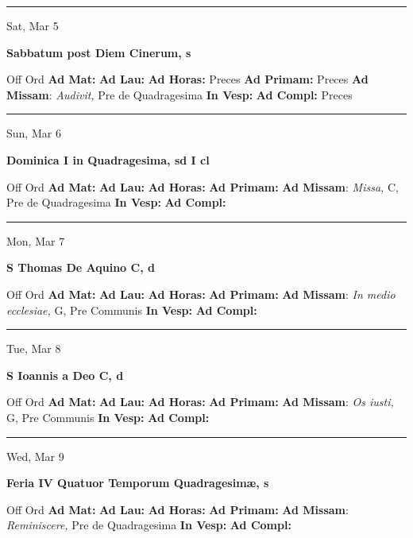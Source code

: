 \documentclass[letterpaper, 10pt]{article}
\begin{document}
\hrule
\begin{center}
Sat, Mar 5
\end{center}\textbf{ \large Sabbatum post Diem Cinerum, \textnormal{\normalsize s}}
\begin{justify}
Off Ord
\textbf{Ad Mat: }
\textbf{Ad Lau: }
\textbf{Ad Horas: }Preces
\textbf{Ad Primam: }Preces
\textbf{Ad Missam}: \textit{Audivit,} Pre de Quadragesima
\textbf{In Vesp: }
\textbf{Ad Compl: }Preces\end{justify}



\hrule
\begin{center}
Sun, Mar 6
\end{center}\textbf{ \large Dominica I in Quadragesima, \textnormal{\normalsize sd I cl}}
\begin{justify}
Off Ord
\textbf{Ad Mat: }
\textbf{Ad Lau: }
\textbf{Ad Horas: }
\textbf{Ad Primam: }
\textbf{Ad Missam}: \textit{Missa,} C, Pre de Quadragesima
\textbf{In Vesp: }
\textbf{Ad Compl: }\end{justify}



\hrule
\begin{center}
Mon, Mar 7
\end{center}\textbf{ \large S Thomas De Aquino C, \textnormal{\normalsize d}}
\begin{justify}
Off Ord
\textbf{Ad Mat: }
\textbf{Ad Lau: }
\textbf{Ad Horas: }
\textbf{Ad Primam: }
\textbf{Ad Missam}: \textit{In medio ecclesiae,} G, Pre Communis
\textbf{In Vesp: }
\textbf{Ad Compl: }\end{justify}



\hrule
\begin{center}
Tue, Mar 8
\end{center}\textbf{ \large S Ioannis a Deo C, \textnormal{\normalsize d}}
\begin{justify}
Off Ord
\textbf{Ad Mat: }
\textbf{Ad Lau: }
\textbf{Ad Horas: }
\textbf{Ad Primam: }
\textbf{Ad Missam}: \textit{Os iusti,} G, Pre Communis
\textbf{In Vesp: }
\textbf{Ad Compl: }\end{justify}



\hrule
\begin{center}
Wed, Mar 9
\end{center}\textbf{ \large Feria IV Quatuor Temporum Quadragesimæ, \textnormal{\normalsize s}}
\begin{justify}
Off Ord
\textbf{Ad Mat: }
\textbf{Ad Lau: }
\textbf{Ad Horas: }
\textbf{Ad Primam: }
\textbf{Ad Missam}: \textit{Reminiscere,} Pre de Quadragesima
\textbf{In Vesp: }
\textbf{Ad Compl: }\end{justify}
\end{document}

